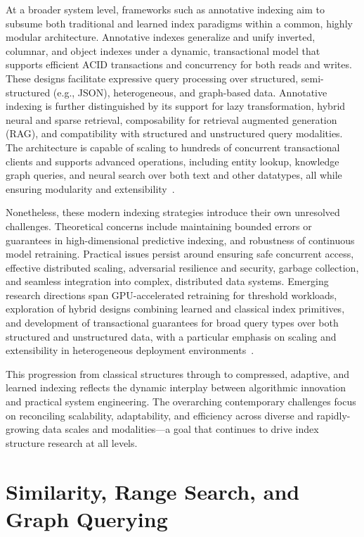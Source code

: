 \documentclass[sigconf]{acmart}
\begin{document}
At a broader system level, frameworks such as annotative indexing aim to subsume both traditional and learned index paradigms within a common, highly modular architecture. Annotative indexes generalize and unify inverted, columnar, and object indexes under a dynamic, transactional model that supports efficient ACID transactions and concurrency for both reads and writes. These designs facilitate expressive query processing over structured, semi-structured (e.g., JSON), heterogeneous, and graph-based data. Annotative indexing is further distinguished by its support for lazy transformation, hybrid neural and sparse retrieval, composability for retrieval augmented generation (RAG), and compatibility with structured and unstructured query modalities. The architecture is capable of scaling to hundreds of concurrent transactional clients and supports advanced operations, including entity lookup, knowledge graph queries, and neural search over both text and other datatypes, all while ensuring modularity and extensibility~\cite{ref112}.

Nonetheless, these modern indexing strategies introduce their own unresolved challenges. Theoretical concerns include maintaining bounded errors or guarantees in high-dimensional predictive indexing, and robustness of continuous model retraining. Practical issues persist around ensuring safe concurrent access, effective distributed scaling, adversarial resilience and security, garbage collection, and seamless integration into complex, distributed data systems. Emerging research directions span GPU-accelerated retraining for threshold workloads, exploration of hybrid designs combining learned and classical index primitives, and development of transactional guarantees for broad query types over both structured and unstructured data, with a particular emphasis on scaling and extensibility in heterogeneous deployment environments~\cite{ref110,ref111,ref112}.

This progression from classical structures through to compressed, adaptive, and learned indexing reflects the dynamic interplay between algorithmic innovation and practical system engineering. The overarching contemporary challenges focus on reconciling scalability, adaptability, and efficiency across diverse and rapidly-growing data scales and modalities—a goal that continues to drive index structure research at all levels.

\section{Similarity, Range Search, and Graph Querying}
\end{document}
